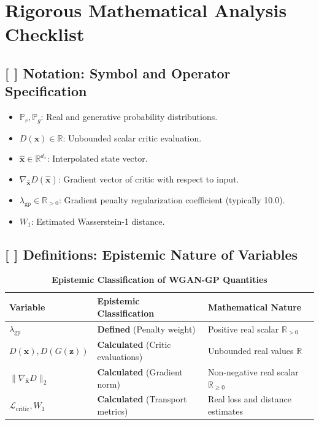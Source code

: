 \documentclass[11pt,a4paper]{article}
\theoremstyle{definition}
\begin{document}
\section{Rigorous Mathematical Analysis Checklist}

\subsection{[ ] Notation: Symbol and Operator Specification}
\begin{itemize}
    \item $\mathbb{P}_r, \mathbb{P}_g$: Real and generative probability distributions.
    \item $D(\mathbf{x}) \in \mathbb{R}$: Unbounded scalar critic evaluation.
    \item $\hat{\mathbf{x}} \in \mathbb{R}^{d_x}$: Interpolated state vector.
    \item $\nabla_{\hat{\mathbf{x}}} D(\hat{\mathbf{x}})$: Gradient vector of critic with respect to input.
    \item $\lambda_{\text{gp}} \in \mathbb{R}_{> 0}$: Gradient penalty regularization coefficient (typically 10.0).
    \item $W_1$: Estimated Wasserstein-1 distance.
\end{itemize}

\subsection{[ ] Definitions: Epistemic Nature of Variables}
\begin{table}[h]
\centering
\caption{\textbf{Epistemic Classification of WGAN-GP Quantities}}
\begin{tabular}{lll}
\toprule
\textbf{Variable} & \textbf{Epistemic Classification} & \textbf{Mathematical Nature} \\
\midrule
$\lambda_{\text{gp}}$ & \textbf{Defined} (Penalty weight) & Positive real scalar $\mathbb{R}_{> 0}$ \\
$D(\mathbf{x}), D(G(\mathbf{z}))$ & \textbf{Calculated} (Critic evaluations) & Unbounded real values $\mathbb{R}$ \\
$\|\nabla_{\hat{\mathbf{x}}} D\|_2$ & \textbf{Calculated} (Gradient norm) & Non-negative real scalar $\mathbb{R}_{\ge 0}$ \\
$\mathcal{L}_{\text{critic}}, W_1$ & \textbf{Calculated} (Transport metrics) & Real loss and distance estimates \\
\bottomrule
\end{tabular}
\end{table}
\end{document}
